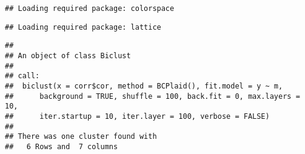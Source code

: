 \documentclass[
  oneside]{book}
\newenvironment{Shaded}{\begin{snugshade}}{\end{snugshade}}
\newcommand{\AttributeTok}[1]{\textcolor[rgb]{0.77,0.63,0.00}{#1}}
\newcommand{\CommentTok}[1]{\textcolor[rgb]{0.56,0.35,0.01}{\textit{#1}}}
\newcommand{\ConstantTok}[1]{\textcolor[rgb]{0.00,0.00,0.00}{#1}}
\newcommand{\DecValTok}[1]{\textcolor[rgb]{0.00,0.00,0.81}{#1}}
\newcommand{\FunctionTok}[1]{\textcolor[rgb]{0.00,0.00,0.00}{#1}}
\newcommand{\NormalTok}[1]{#1}
\newcommand{\OtherTok}[1]{\textcolor[rgb]{0.56,0.35,0.01}{#1}}
\newcommand{\SpecialCharTok}[1]{\textcolor[rgb]{0.00,0.00,0.00}{#1}}
\begin{document}
\begin{verbatim}
## Loading required package: colorspace
\end{verbatim}

\begin{verbatim}
## Loading required package: lattice
\end{verbatim}

\begin{Shaded}
\end{Shaded}

\begin{verbatim}
## 
## An object of class Biclust 
## 
## call:
##  biclust(x = corr$cor, method = BCPlaid(), fit.model = y ~ m, 
##      background = TRUE, shuffle = 100, back.fit = 0, max.layers = 10, 
##      iter.startup = 10, iter.layer = 100, verbose = FALSE)
## 
## There was one cluster found with
##   6 Rows and  7 columns
\end{verbatim}
\end{document}
